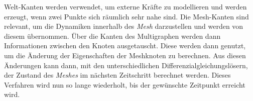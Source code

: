 Welt-Kanten werden verwendet, um externe Kräfte zu modellieren und werden erzeugt, 
wenn zwei Punkte sich räumlich sehr nahe sind.
Die Mesh-Kanten sind relevant, um die Dynamiken innerhalb des \textit{Mesh} darzustellen und werden von diesem übernommen.
Über die Kanten des Multigraphen werden dann Informationen zwischen den Knoten ausgetauscht.
Diese werden dann genutzt, um die Änderung der Eigenschaften der Meshknoten zu berechnen.
Aus diesen Änderungen kann dann, mit den unterschiedlichen Differenzialgleichungslösern, der Zustand des \textit{Meshes} im nächsten Zeitschritt berechnet werden. 
Dieses Verfahren wird nun so lange wiederholt, bis der gewünschte Zeitpunkt erreicht wird.










